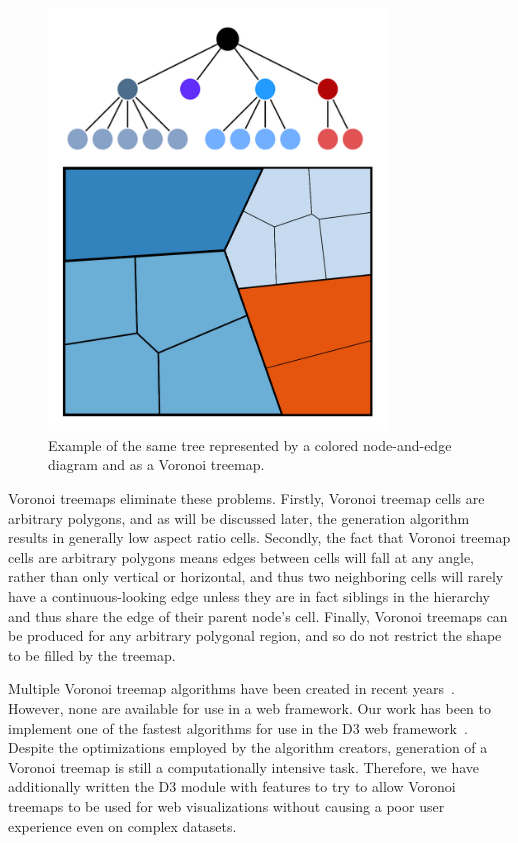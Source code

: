\documentclass{acm_proc_article-sp} \usepackage{cite}
\begin{document}
\begin{figure}
\centering \includegraphics[width=90mm]{figures/tree-example.png}
\caption{Example of the same tree represented by a colored
  node-and-edge diagram and as a Voronoi treemap.}
\label{tree:example}
\end{figure}

Voronoi treemaps eliminate these problems. Firstly, Voronoi treemap
cells are arbitrary polygons, and as will be discussed later, the
generation algorithm results in generally low aspect ratio
cells. Secondly, the fact that Voronoi treemap cells are arbitrary
polygons means edges between cells will fall at any angle, rather than
only vertical or horizontal, and thus two neighboring cells will
rarely have a continuous-looking edge unless they are in fact
siblings in the hierarchy and thus share the edge of their parent
node's cell. Finally, Voronoi treemaps can be produced for any
arbitrary polygonal region, and so do not restrict the shape to be
filled by the treemap.

Multiple Voronoi treemap algorithms have been created in recent 
years~\cite{balzer:treemaps, sud:fast, nocaj:faster}. However,
none are available for use in a web framework.  Our work has been to
implement one of the fastest algorithms for use in the D3 web
framework~\cite{Bostock2011}. Despite the optimizations employed by the algorithm
creators, generation of a Voronoi treemap is still a computationally
intensive task. Therefore, we have additionally written the D3 module
with features to try to allow Voronoi treemaps to be used for web
visualizations without causing a poor user experience even on complex
datasets.
\end{document}
